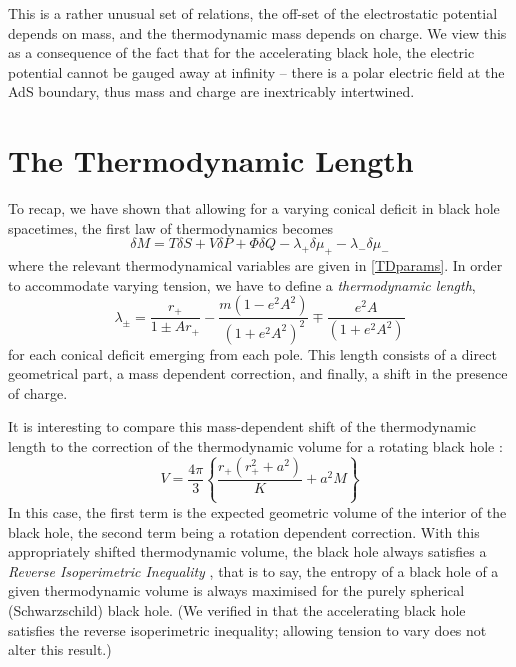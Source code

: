 \documentclass[
twoside,openright,frontopenright]{dmathesis}
\begin{document}
This is a rather unusual set of relations, the off-set of the electrostatic
potential depends on mass, and the thermodynamic mass depends on charge. We view
this as a consequence of the fact that for the accelerating black hole, the
electric potential cannot be gauged away at infinity -- there is a polar
electric field at the AdS boundary, thus mass and charge are inextricably
intertwined.

\section{The Thermodynamic Length}

To recap, we have shown that allowing for a varying conical deficit
in black hole spacetimes, the first law of thermodynamics becomes
\begin{equation}
\delta M = T \delta S + V\delta P + \Phi \delta Q - \lambda_+ \delta \mu_+
- \lambda_- \delta \mu_-
\end{equation}
where the relevant thermodynamical variables are given in \eqref{TDparams}.
In order to accommodate varying 
tension, we have to define a {\it thermodynamic length},
\begin{equation}
\lambda_\pm = \frac{r_+}{1\pm Ar_+} - \frac{m(1-e^2A^2)}{(1+e^2 A^2)^2} 
\mp \frac{e^2A}{(1+e^2 A^2)}
\end{equation}
for each conical deficit emerging from each pole. This length consists of 
a direct geometrical part, a mass dependent correction, and finally, a shift
in the presence of charge.

It is interesting to compare this mass-dependent shift of the thermodynamic
length to the correction of the thermodynamic volume for a rotating black
hole \cite{Cvetic:2010jb,Dolan:2011jm}:
\begin{equation}
V = \frac{4\pi}{3} \left \{ \frac{r_+(r_+^2+a^2)}{K} + a^2 M \right\}
\end{equation}
In this case, the first term is the expected geometric volume of the 
interior of the black hole, the second term being a rotation dependent
correction. With this appropriately shifted thermodynamic volume,
the black hole always satisfies a {\it Reverse Isoperimetric Inequality}
\cite{Cvetic:2010jb}, that is to say, the entropy of a black hole of a given
thermodynamic volume is always maximised for the purely spherical
(Schwarzschild) black hole. (We verified in \cite{Appels:2016uha} that
the accelerating black hole satisfies the reverse isoperimetric inequality;
allowing tension to vary does not alter this result.)
\end{document}
